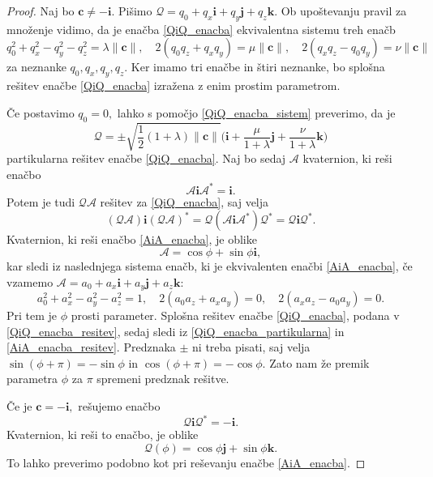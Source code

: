 \documentclass[12pt,a4paper,twoside]{article}
\theoremstyle{definition} %
\theoremstyle{plain} %
\theoremstyle{primerstyle}
\numberwithin{equation}{section}  %
\newcommand{\cV}{\mathbf{c}}
\newcommand{\iV}{\mathbf{i}}
\newcommand{\jV}{\mathbf{j}}
\newcommand{\kV}{\mathbf{k}}
\newcommand{\AQ}{\mathcal{A}}
\newcommand{\QQ}{\mathcal{Q}}
\begin{document}
\begin{proof}
	Naj bo $\cV\neq-\iV.$ Pišimo $\QQ=q_0+q_x\iV+q_y\jV+q_z\kV.$ Ob upoštevanju pravil za množenje vidimo, da je enačba \eqref{QiQ_enacba} ekvivalentna sistemu treh enačb
	\begin{equation}
		\label{QiQ_enacba_sistem}
		q_0^2+q_x^2-q_y^2-q_z^2=\lambda\lVert\cV\rVert,\quad 2(q_0q_z+q_xq_y)=\mu\lVert\cV\rVert,\quad 2(q_xq_z-q_0q_y)=\nu\lVert\cV\rVert
	\end{equation}
	za neznanke $q_0,q_x,q_y,q_z.$ Ker imamo tri enačbe in štiri neznanke, bo splošna rešitev enačbe \eqref{QiQ_enacba} izražena z enim prostim parametrom.
	
	Če postavimo $q_0=0,$ lahko s pomočjo \eqref{QiQ_enacba_sistem} preverimo, da je
	\begin{equation}
		\label{QiQ_enacba_partikularna}
		\QQ=\pm\sqrt{\frac{1}{2}(1+\lambda)\lVert\cV\rVert}\Big(\iV+\frac{\mu}{1+\lambda}\jV+\frac{\nu}{1+\lambda}\kV\Big)
	\end{equation}
	partikularna rešitev enačbe \eqref{QiQ_enacba}. Naj bo sedaj $\AQ$ kvaternion, ki reši enačbo
	\begin{equation}
		\label{AiA_enacba}
		\AQ\iV\AQ^*=\iV.
	\end{equation}
	Potem je tudi $\QQ\AQ$ rešitev za \eqref{QiQ_enacba}, saj velja
	$$(\QQ\AQ)\iV(\QQ\AQ)^*=\QQ(\AQ\iV\AQ^*)\QQ^*=\QQ\iV\QQ^*.$$
	Kvaternion, ki reši enačbo \eqref{AiA_enacba}, je oblike
	\begin{equation}
		\label{AiA_enacba_resitev}
		\AQ=\cos\phi+\sin\phi\iV,
	\end{equation}
	kar sledi iz naslednjega sistema enačb, ki je ekvivalenten enačbi \eqref{AiA_enacba}, če vzamemo $\AQ=a_0+a_x\iV+a_y\jV+a_z\kV$:
	$$a_0^2+a_x^2-a_y^2-a_z^2=1,\quad 2(a_0a_z+a_xa_y)=0,\quad 2(a_xa_z-a_0a_y)=0.$$
	Pri tem je $\phi$ prosti parameter. Splošna rešitev enačbe \eqref{QiQ_enacba}, podana v \eqref{QiQ_enacba_resitev}, sedaj sledi iz \eqref{QiQ_enacba_partikularna} in \eqref{AiA_enacba_resitev}. Predznaka $\pm$ ni treba pisati, saj velja $\sin(\phi+\pi)=-\sin\phi$ in $\cos(\phi+\pi)=-\cos\phi.$ Zato nam že premik parametra $\phi$ za $\pi$ spremeni predznak rešitve.
	
	Če je $\cV=-\iV,$ rešujemo enačbo
	\begin{equation}
		\label{QiQ-i_enacba}
		\QQ\iV\QQ^*=-\iV.
	\end{equation}
	Kvaternion, ki reši to enačbo, je oblike
	\begin{equation}
		\label{QiQ-i_enacba_resitev}
		\QQ(\phi)=\cos\phi\jV+\sin\phi\kV.
	\end{equation}
	To lahko preverimo podobno kot pri reševanju enačbe \eqref{AiA_enacba}.
\end{proof}
\clearpage
\end{document}
